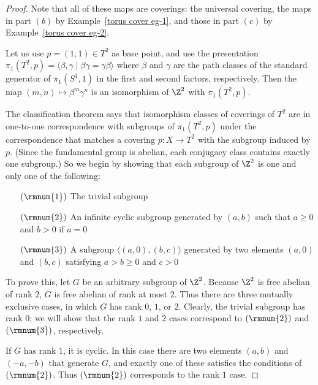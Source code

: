 \begin{proof}
Note that all of these maps are coverings: the universal covering, the maps in part $(b)$ by Example~\ref{torus cover eg-1}, and those in part $(c)$ by Example~\ref{torus cover eg-2}.\par
Let us use $p=(1,1)\in T^2$ as base point, and use the presentation $\pi_1(T^2,p)=\langle\beta,\gamma\mid\beta\gamma=\gamma\beta\rangle$ where $\beta$ and $\gamma$ are the path classes of the standard generator of $\pi_1(S^1,1)$ in the first and second factors, respectively. Then the map $(m,n)\mapsto\beta^m\gamma^n$ is an isomorphism of $\Z^2$ with $\pi_1(T^2,p)$.\par 
The classification theorem says that isomorphism classes of coverings of $T^2$ are in one-to-one correspondence with subgroups of $\pi_1(T^2,p)$ under the correspondence that matches a covering $p:X\to T^2$ with the subgroup induced by $p$. (Since the fundamental group is abelian, each conjugacy class contains exactly one subgroup.) So we begin by showing that each subgroup of $\Z^2$ is one and only one of the following:
\begin{itemize}
\item[$(\rmnum{1})$] The trivial subgroup
\item[$(\rmnum{2})$] An infinite cyclic subgroup generated by $(a,b)$ such that $a\geq0$ and $b>0$ if $a=0$
\item[$(\rmnum{3})$] A subgroup $\langle(a,0),(b,c)\rangle$ generated by two elements $(a,0)$ and $(b,c)$ satisfying $a>b\geq0$ and $c>0$
\end{itemize}
To prove this, let $G$ be an arbitrary subgroup of $\Z^2$. Because $\Z^2$ is free abelian of rank $2$, $G$ is free abelian of rank at most $2$. Thus there are
three mutually exclusive cases, in which $G$ has rank $0$, $1$, or $2$. Clearly, the trivial subgroup has rank $0$; we will show that the rank $1$ and $2$ cases correspond to $(\rmnum{2})$ and $(\rmnum{3})$, respectively.\par
If $G$ has rank $1$, it is cyclic. In this case there are two elements $(a,b)$ and $(-a,-b)$ that generate $G$, and exactly one of these satisfies the conditions of $(\rmnum{2})$. Thus $(\rmnum{2})$ corresponds to the rank $1$ case.\par

\end{proof}
